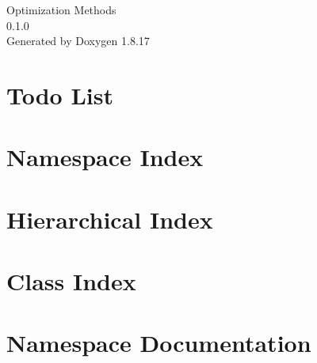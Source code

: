 \let\mypdfximage\pdfximage\def\pdfximage{\immediate\mypdfximage}\documentclass[twoside]{book}
\newcommand{\+}{\discretionary{\mbox{\scriptsize$\hookleftarrow$}}{}{}}
\newcommand{\clearemptydoublepage}{%
  \newpage{\pagestyle{empty}\cleardoublepage}%
}
\begin{document}
\hypersetup{pageanchor=false,
             bookmarksnumbered=true,
             pdfencoding=unicode
            }
\begin{titlepage}
\vspace*{7cm}
\begin{center}%
{\Large Optimization Methods \\[1ex]\large 0.\+1.\+0 }\\
\vspace*{1cm}
{\large Generated by Doxygen 1.8.17}\\
\end{center}
\end{titlepage}
\clearemptydoublepage
{}
\tableofcontents
\clearemptydoublepage
{}
\hypersetup{pageanchor=true}

\chapter{Todo List}
\label{todo}

\chapter{Namespace Index}

\chapter{Hierarchical Index}

\chapter{Class Index}

\chapter{Namespace Documentation}













\end{document}
